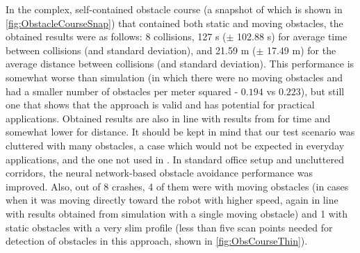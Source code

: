 In the complex, self-contained obstacle course (a snapshot of which is shown in \cref{fig:ObstacleCourseSnap}) that contained both static and moving obstacles, the obtained results were as follows: 8 collisions, 127 s ($\pm$ 102.88 s) for average time between collisions (and standard deviation), and 21.59 m ($\pm$ 17.49 m) for the average distance between collisions (and standard deviation). This performance is somewhat worse than simulation (in which there were no moving obstacles and had a smaller number of obstacles per meter squared - $0.194$ vs $0.223$), but still one that shows that the approach is valid and has potential for practical applications. Obtained results are also in line with results from \cite{Gandhi2017} for time and somewhat lower for distance. It should be kept in mind that our test scenario was cluttered with many obstacles, a case which would not be expected in everyday applications, and the one not used in \cite{Gandhi2017}. In standard office setup and uncluttered corridors, the neural network-based obstacle avoidance performance was improved. Also, out of 8 crashes, 4 of them were with moving obstacles (in cases when it was moving directly toward the robot with higher speed, again in line with results obtained from simulation with a single moving obstacle) and 1 with static obstacles with a very slim profile (less than five scan points needed for detection of obstacles in this approach, shown in \cref{fig:ObsCourseThin}). 

